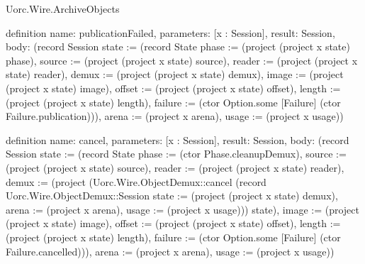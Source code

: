 \begin{lexlean}{Uorc.Wire.ArchiveObjects}
\begin{semanticmodule}
definition{
  name: publicationFailed,
  parameters: [x : Session],
  result: Session,
  body: (record Session {state := (record State {phase := (project (project x state) phase), source := (project (project x state) source), reader := (project (project x state) reader), demux := (project (project x state) demux), image := (project (project x state) image), offset := (project (project x state) offset), length := (project (project x state) length), failure := (ctor Option.some [Failure] (ctor Failure.publication))}), arena := (project x arena), usage := (project x usage)})
}

definition{
  name: cancel,
  parameters: [x : Session],
  result: Session,
  body: (record Session {state := (record State {phase := (ctor Phase.cleanupDemux), source := (project (project x state) source), reader := (project (project x state) reader), demux := (project (Uorc.Wire.ObjectDemux::cancel (record Uorc.Wire.ObjectDemux::Session {state := (project (project x state) demux), arena := (project x arena), usage := (project x usage)})) state), image := (project (project x state) image), offset := (project (project x state) offset), length := (project (project x state) length), failure := (ctor Option.some [Failure] (ctor Failure.cancelled))}), arena := (project x arena), usage := (project x usage)})
}


\end{semanticmodule}
\end{lexlean}
